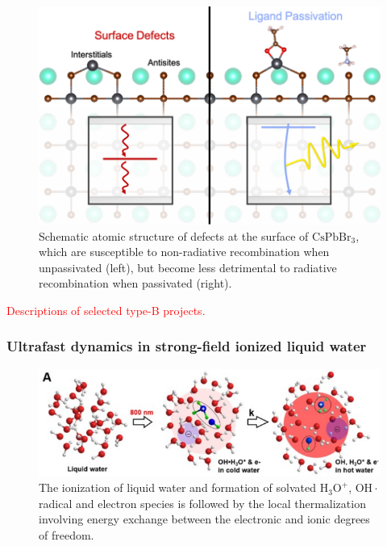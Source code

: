 \begin{figure}[h]
	\centering
	\includegraphics{figures/defect_passivation}
	\caption{
		Schematic atomic structure of defects at the surface of \(\mathrm{CsPbBr_3}\), which are susceptible to non-radiative recombination when unpassivated (left), but become less detrimental to radiative recombination when passivated (right).
	}
	\label{fig:defect}
\end{figure}

\textcolor{red}{Descriptions of selected type-B projects.}

\subsubsection{Ultrafast dynamics in strong-field ionized liquid water} 

\begin{figure}[h]
	\centering
	\includegraphics{figures/Water}
	\caption{
		The ionization of liquid water and formation of solvated \(\mathrm{H_3O^+}\), \(\mathrm{OH\cdot}\) radical and electron species is followed by the local thermalization involving energy exchange between the electronic and ionic degrees of freedom.
	}
	\label{fig:water}
\end{figure}

